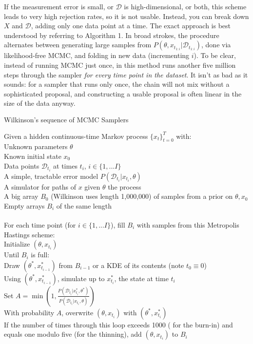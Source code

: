 \documentclass{article}
\begin{document}
If the measurement error is small, or $\mathcal{D}$ is high-dimensional, or both, this scheme leads to very high rejection rates, so it is not usable. Instead, you can break down $X$ and $\mathcal{D}$, adding only one data point at a time. The exact approach is best understood by referring to Algorithm 1. In broad strokes, the procedure alternates between generating large samples from $P(\theta, x_{t_{1:i}}|\mathcal{D}_{t_{1:i}})$, done via  likelihood-free MCMC, and folding in new data (incrementing $i$). To be clear, instead of running MCMC just once, in this method runs another five million steps through the sampler {\it for every time point in the dataset}. It isn't as bad as it sounds: for a sampler that runs only once, the chain will not mix without a sophisticated proposal, and constructing a usable proposal is often linear in the size of the data anyway. %
 

\begin{algorithm}[h]
\caption{ \label{seqMCMC} Wilkinson's sequence of MCMC Samplers}
Given a hidden continuous-time Markov process $\{x_t\}_{t=0}^T$ with: \\
\Indp \Indp
Unknown parameters $\theta$\\
Known initial state $x_0$\\
Data points $\mathcal{D}_{t_{i}}$ at times $t_{i}$, $i \in \{1, ... I\}$ \\
A simple, tractable error model $P(\mathcal{D}_{t_{i}}|x_{t_{i}}, \theta)$\\
A simulator for paths of $x$ given $\theta$ the process\\
A big array $B_0$ (Wilkinson uses length 1,000,000) of samples from a prior on $\theta, x_0$\\
Empty arrays $B_{i}$ of the same length\\
$\phantom{0}$\\
\Indm \Indm
For each time point (for $i \in \{1, ... I\}$), fill $B_{i}$ with samples from this Metropolis Hastings scheme:\\
\Indp\Indp
Initialize $(\theta, x_{t_{i}})$ \\
Until $B_{i}$ is full: \\
\Indp\Indp
Draw $(\theta^*, x_{t_{i-1}}^*)$ from $B_{i-1}$ or a KDE of its contents (note $t_0\equiv0$)\\
Using $(\theta^*, x_{t_{i-1}}^*)$, simulate up to $x_{t_{i}}^*$, the state at time $t_{i}$ \\
Set $A=\min(1, \frac{P(\mathcal{D}_{t_{i}}|x_{t_{i}}^*, \theta^*)}{P(\mathcal{D}_{t_{i}}|x_{t_{i}}, \theta)})$\\
With probability $A$, overwrite $(\theta, x_{t_{i}})$ with $(\theta^*, x_{t_{i}}^*)$\\
If the number of times through this loop exceeds 1000 ( for the burn-in) and equals one modulo five (for the thinning), add $(\theta, x_{t_{i}})$ to $B_{i}$\\
\Indm \Indm
\end{algorithm}
\end{document}
